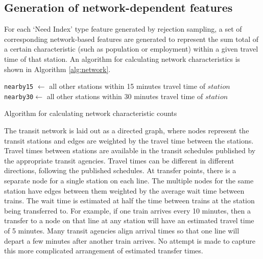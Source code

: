 \documentclass[11pt]{article}
\begin{document}
\subsection{Generation of network-dependent features}\label{sec:net}

For each `Need Index' type feature generated by rejection sampling, a set of corresponding network-based features are generated to represent the sum total of a certain characteristic (such as population or employment) within a given travel time of that station. An algorithm for calculating network characteristics is shown in Algorithm \ref{alg:network}. 

\begin{algorithm}
\begin{algorithmic}
	\State\texttt{nearby15} $\gets$ all other stations within 15 minutes travel time of $station$
	\State \texttt{nearby30}$ \gets$ all other stations within 30 minutes travel time of $station$
		\EndFor
		\EndFor
	\EndFor
\EndFor
\end{algorithmic}\caption{Algorithm for calculating network characteristic counts}\label{alg:network}
\end{algorithm}

The transit network is laid out as a directed graph, where nodes represent the transit stations and edges are weighted by the travel time between the stations. Travel times between stations are available in the transit schedules published by the appropriate transit agencies. Travel times can be different in different directions, following the published schedules. At transfer points, there is a separate node for a single station on each line. The multiple nodes for the same station have edges between them weighted by the average wait time between trains. The wait time is estimated at half the time between trains at the station being transferred to. For example, if one train arrives every 10 minutes, then a transfer to a node on that line at any station will have an estimated travel time of 5 minutes. Many transit agencies align arrival times so that one line will depart a few minutes after another train arrives. No attempt is made to capture this more complicated arrangement of estimated transfer times. 
\end{document}
